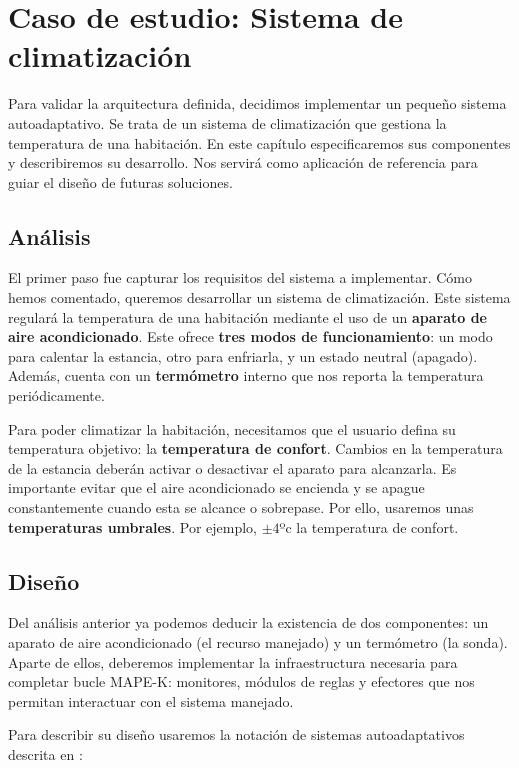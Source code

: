 \chapter{Caso de estudio: Sistema de climatización}
\label{chap:caso_estudio}

Para validar la arquitectura definida, decidimos implementar un pequeño sistema autoadaptativo. Se trata de un sistema de climatización que gestiona la temperatura de una habitación. En este capítulo especificaremos sus componentes y describiremos su desarrollo. Nos servirá como aplicación de referencia para guiar el diseño de futuras soluciones.

\section{Análisis}

El primer paso fue capturar los requisitos del sistema a implementar. Cómo hemos comentado, queremos desarrollar un sistema de climatización. Este sistema regulará la temperatura de una habitación mediante el uso de un \textbf{aparato de aire acondicionado}. Este ofrece \textbf{tres modos de funcionamiento}: un modo para calentar la estancia, otro para enfriarla, y un estado neutral (apagado). Además, cuenta con un \textbf{termómetro} interno que nos reporta la temperatura periódicamente.

Para poder climatizar la habitación, necesitamos que el usuario defina su temperatura objetivo: la \textbf{temperatura de confort}. Cambios en la temperatura de la estancia deberán activar o desactivar el aparato para alcanzarla. Es importante evitar que el aire acondicionado se encienda y se apague constantemente cuando esta se alcance o sobrepase. Por ello, usaremos unas \textbf{temperaturas umbrales}. Por ejemplo, $\pm 4$ºc la temperatura de confort.

\section{Diseño}

Del análisis anterior ya podemos deducir la existencia de dos componentes: un aparato de aire acondicionado (el recurso manejado) y un termómetro (la sonda). Aparte de ellos, deberemos implementar la infraestructura necesaria para completar bucle MAPE-K: monitores, módulos de reglas y efectores que nos permitan interactuar con el sistema manejado.

Para describir su diseño usaremos la notación de sistemas autoadaptativos descrita en \cite{fonsEspecificacionSistemasAutoadaptativos2021}:

